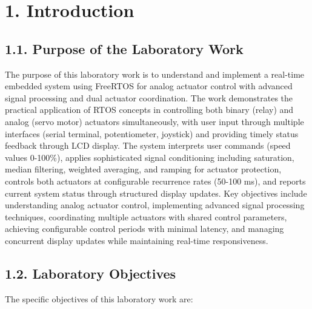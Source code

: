 \documentclass[12pt]{article}
\begin{document}
\setcounter{page}{1}
\pagestyle{fancy}
\fancyhf{}
\rhead{\thepage}

\section*{1. Introduction}

\subsection*{1.1. Purpose of the Laboratory Work}

The purpose of this laboratory work is to understand and implement a real-time embedded system using FreeRTOS for analog actuator control with advanced signal processing and dual actuator coordination. The work demonstrates the practical application of RTOS concepts in controlling both binary (relay) and analog (servo motor) actuators simultaneously, with user input through multiple interfaces (serial terminal, potentiometer, joystick) and providing timely status feedback through LCD display. The system interprets user commands (speed values 0-100\%), applies sophisticated signal conditioning including saturation, median filtering, weighted averaging, and ramping for actuator protection, controls both actuators at configurable recurrence rates (50-100 ms), and reports current system status through structured display updates. Key objectives include understanding analog actuator control, implementing advanced signal processing techniques, coordinating multiple actuators with shared control parameters, achieving configurable control periods with minimal latency, and managing concurrent display updates while maintaining real-time responsiveness.

\subsection*{1.2. Laboratory Objectives}

The specific objectives of this laboratory work are:
\end{document}
